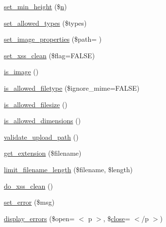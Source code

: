 \begin{DoxyCompactItemize}
\item 
\hyperlink{class_c_i___upload_a72c6007605b27c92dfd83c6e21fe82e3}{set\+\_\+min\+\_\+height} (\$\hyperlink{cli_2error__general_8php_ace0fd03cd383f20ce6ea63247a207294}{n})
\item 
\hyperlink{class_c_i___upload_a7c7ddfefedddc3fd625dd816d67c21bf}{set\+\_\+allowed\+\_\+types} (\$types)
\item 
\hyperlink{class_c_i___upload_a5a85ab4c11b130ebc33ba1f07baac1fe}{set\+\_\+image\+\_\+properties} (\$path= \textquotesingle{}\textquotesingle{})
\item 
\hyperlink{class_c_i___upload_a5556024223414507d84d221862919212}{set\+\_\+xss\+\_\+clean} (\$flag=F\+A\+L\+S\+E)
\item 
\hyperlink{class_c_i___upload_af6f513bc693e3ba836f23fe9bebc6427}{is\+\_\+image} ()
\item 
\hyperlink{class_c_i___upload_a248e8cef69fc954953dc988e8d82afca}{is\+\_\+allowed\+\_\+filetype} (\$ignore\+\_\+mime=F\+A\+L\+S\+E)
\item 
\hyperlink{class_c_i___upload_aa1283241c3b2fc700c7b577beecd5f97}{is\+\_\+allowed\+\_\+filesize} ()
\item 
\hyperlink{class_c_i___upload_a70d66ccc85ab4ec9e76e02cfeaccc193}{is\+\_\+allowed\+\_\+dimensions} ()
\item 
\hyperlink{class_c_i___upload_a067f092935018f0d1fbfa955ddecfee3}{validate\+\_\+upload\+\_\+path} ()
\item 
\hyperlink{class_c_i___upload_a6c656eedccb1131accc8e350bc50632f}{get\+\_\+extension} (\$filename)
\item 
\hyperlink{class_c_i___upload_ab1f627192a69c4b88a44ad60ba05d0af}{limit\+\_\+filename\+\_\+length} (\$filename, \$length)
\item 
\hyperlink{class_c_i___upload_ae7e5f9b6d774795da126647f10c3c2a6}{do\+\_\+xss\+\_\+clean} ()
\item 
\hyperlink{class_c_i___upload_a892f1ba7cba3731a3fc68f1f64e92610}{set\+\_\+error} (\$msg)
\item 
\hyperlink{class_c_i___upload_a3ed4aa1a4d480c82bb1b663efd466aee}{display\+\_\+errors} (\$open= \textquotesingle{}$<$ p $>$\textquotesingle{}, \$\hyperlink{bootstrap_8min_8js_afaca3a961d693f40135a872e93e71198}{close}= \textquotesingle{}$<$/p $>$\textquotesingle{})
\end{DoxyCompactItemize}
